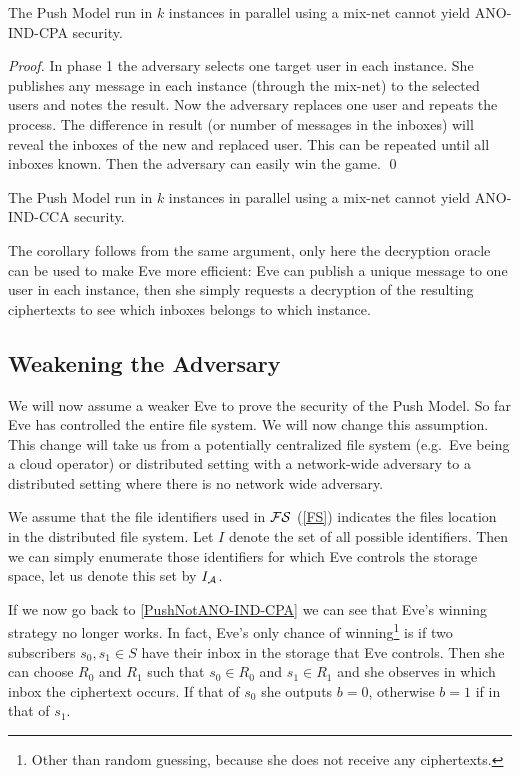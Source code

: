 \begin{theorem}\label{PushNotANO-IND-CPA}
  The Push Model run in \(k\) instances in parallel using a mix-net cannot 
  yield ANO-IND-CPA security.
\end{theorem}

\begin{proof}
  In phase 1 the adversary selects one target user in each instance.
  She publishes any message in each instance (through the mix-net) to the 
  selected users and notes the result.
  Now the adversary replaces one user and repeats the process.
  The difference in result (or number of messages in the inboxes) will reveal 
  the inboxes of the new and replaced user.
  This can be repeated until all inboxes known.
  Then the adversary can easily win the game.
  \qed{}
\end{proof}

\begin{corollary}
  The Push Model run in \(k\) instances in parallel using a mix-net cannot 
  yield ANO-IND-CCA security.
\end{corollary}

The corollary follows from the same argument, only here the decryption oracle 
can be used to make Eve more efficient:
Eve can publish a unique message to one user in each instance, then she simply 
requests a decryption of the resulting ciphertexts to see which inboxes belongs 
to which instance.

\subsection{Weakening the Adversary}

We will now assume a weaker Eve to prove the security of the Push Model.
So far Eve has controlled the entire file system.
We will now change this assumption.
This change will take us from a potentially centralized file system (e.g.\ Eve 
being a cloud operator) or distributed setting with a network-wide adversary to 
a distributed setting where there is no network wide adversary.

We assume that the file identifiers used in \(\FS\) (\cref{FS}) indicates the 
files location in the distributed file system.
Let \(I\) denote the set of all possible identifiers.
Then we can simply enumerate those identifiers for which Eve controls the 
storage space, let us denote this set by \(I_{\A}\).

If we now go back to \cref{PushNotANO-IND-CPA} we can see that Eve's winning 
strategy no longer works.
In fact, Eve's only chance of winning\footnote{Other than random guessing, 
  because she does not receive any ciphertexts.
} is if two subscribers \(s_0, s_1\in S\) have their inbox in the storage that 
Eve controls.
Then she can choose \(R_0\) and \(R_1\) such that \(s_0\in R_0\) and \(s_1\in 
  R_1\) and she observes in which inbox the ciphertext occurs.
If that of \(s_0\) she outputs \(b = 0\), otherwise \(b = 1\) if in that of 
\(s_1\).
